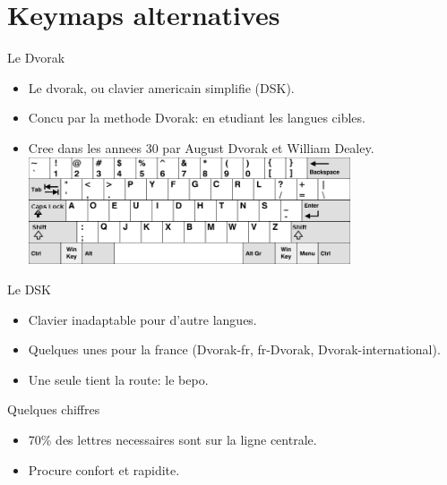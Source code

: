 \section{Keymaps alternatives}

\begin{frame}{Le Dvorak}
    \begin{itemize}
	\item Le dvorak, ou clavier americain simplifie (DSK).
	\item Concu par la methode Dvorak: en etudiant les langues cibles.
	\item Cree dans les annees 30 par August Dvorak et William Dealey.
	\newline
	\newline
	\pause
	\includegraphics[height=90pt]{images/dvorak.png}
    \end{itemize}
\end{frame}

\begin{frame}{Le DSK}
    \begin{itemize}
	\item Clavier inadaptable pour d'autre langues.
	\item Quelques unes pour la france (Dvorak-fr, fr-Dvorak, Dvorak-international).
	\item Une seule tient la route: le bepo.
    \end{itemize}
    Quelques chiffres
    \begin{itemize}
	\item 70\% des lettres necessaires sont sur la ligne centrale.
	\item Procure confort et rapidite.
    \end{itemize}
\end{frame}
